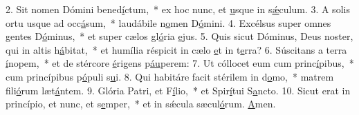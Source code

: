 2. Sit nomen Dómini bened\uline{í}ctum,~* ex hoc nunc, et \uline{u}sque in s\uline{ǽ}culum.
3. A solis ortu usque ad occ\uline{á}sum,~* laudábile n\uline{o}men D\uline{ó}mini.
4. Excélsus super omnes gentes D\uline{ó}minus,~* et super cælos gl\uline{ó}ria \uline{e}jus.
5. Quis sicut Dóminus, Deus noster, qui in altis h\uline{á}bitat,~* et humília réspicit in cælo \uline{e}t in t\uline{e}rra?
6. Súscitans a terra \uline{í}nopem,~* et de stércore \uline{é}rigens p\uline{áu}perem:
7. Ut cóllocet eum cum princ\uline{í}pibus,~* cum princípibus p\uline{ó}puli s\uline{u}i.
8. Qui habitáre facit stérilem in d\uline{o}mo,~* matrem fili\uline{ó}rum læt\uline{á}ntem.
9. Glória Patri, et F\uline{í}lio,~* et Spir\uline{í}tui S\uline{a}ncto.
10. Sicut erat in princípio, et nunc, et s\uline{e}mper,~* et in sǽcula sæcul\uline{ó}rum. \uline{A}men.
